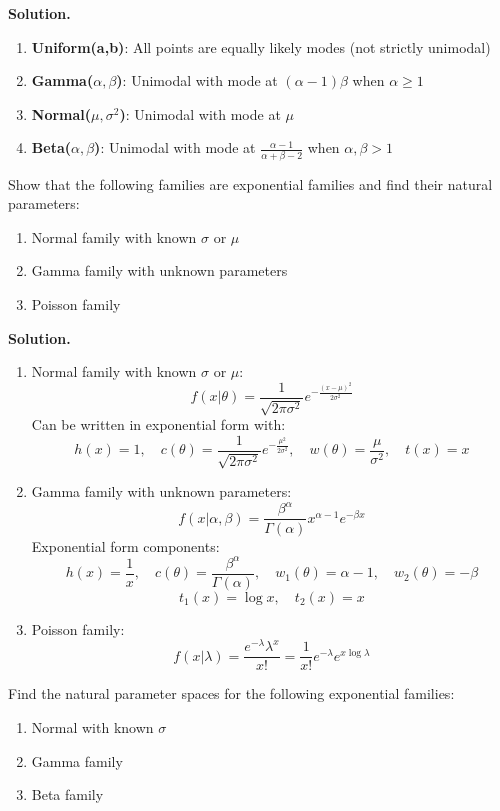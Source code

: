 \noindent\textbf{Solution.}
\begin{enumerate}[label=(\alph*)]
\item \textbf{Uniform(a,b)}: All points are equally likely modes (not strictly unimodal)
\item \textbf{Gamma($\alpha,\beta$)}: Unimodal with mode at $(\alpha-1)\beta$ when $\alpha \geq 1$
\item \textbf{Normal($\mu,\sigma^2$)}: Unimodal with mode at $\mu$
\item \textbf{Beta($\alpha,\beta$)}: Unimodal with mode at $\frac{\alpha-1}{\alpha+\beta-2}$ when $\alpha,\beta > 1$
\end{enumerate}

\begin{problembox}
Show that the following families are exponential families and find their natural parameters:
\begin{enumerate}[label=(\alph*)]
\item Normal family with known $\sigma$ or $\mu$
\item Gamma family with unknown parameters
\item Poisson family
\end{enumerate}
\end{problembox}

\noindent\textbf{Solution.}
\begin{enumerate}[label=(\alph*)]
\item Normal family with known $\sigma$ or $\mu$:
\[ f(x|\theta) = \frac{1}{\sqrt{2\pi\sigma^2}}e^{-\frac{(x-\mu)^2}{2\sigma^2}} \]
Can be written in exponential form with:
\[ h(x) = 1, \quad c(\theta) = \frac{1}{\sqrt{2\pi\sigma^2}}e^{-\frac{\mu^2}{2\sigma^2}}, \quad w(\theta) = \frac{\mu}{\sigma^2}, \quad t(x) = x \]

\item Gamma family with unknown parameters:
\[ f(x|\alpha,\beta) = \frac{\beta^\alpha}{\Gamma(\alpha)}x^{\alpha-1}e^{-\beta x} \]
Exponential form components:
\[ h(x) = \frac{1}{x}, \quad c(\theta) = \frac{\beta^\alpha}{\Gamma(\alpha)}, \quad w_1(\theta) = \alpha-1, \quad w_2(\theta) = -\beta \]
\[ t_1(x) = \log x, \quad t_2(x) = x \]

\item Poisson family:
\[ f(x|\lambda) = \frac{e^{-\lambda}\lambda^x}{x!} = \frac{1}{x!}e^{-\lambda}e^{x\log\lambda} \]
\end{enumerate}

\begin{problembox}
Find the natural parameter spaces for the following exponential families:
\begin{enumerate}[label=(\alph*)]
\item Normal with known $\sigma$
\item Gamma family
\item Beta family
\end{enumerate}
\end{problembox}

